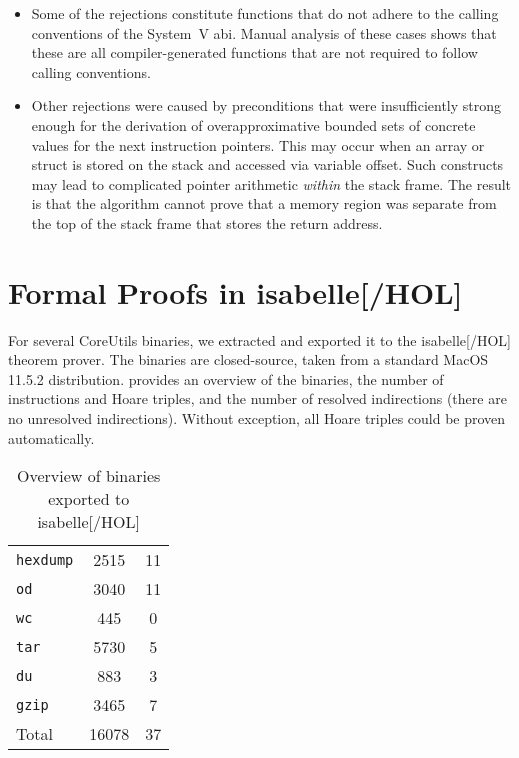 \begin{itemize}
  \item Some of the rejections constitute functions that do not adhere to the calling conventions of the System~V \ac{abi}.
  Manual analysis of these cases shows that these are all compiler-generated functions that are not required to follow calling conventions.
  \item Other rejections were caused by preconditions that were insufficiently strong enough for the derivation of overapproximative bounded sets of concrete values for the next instruction pointers.
  This may occur when an array or struct is stored on the stack and accessed via variable offset.
  Such constructs may lead to complicated pointer arithmetic \emph{within} the stack frame.
  The result is that the algorithm cannot prove that a memory region was separate from the top of the stack frame that stores the return address.
\end{itemize}

\section{Formal Proofs in \gls{isabelle}[/HOL]}\label{sec:not-me-proofs}
For several CoreUtils binaries, we extracted  and exported it to the \gls{isabelle}[/HOL] theorem prover.
The binaries are closed-source, taken from a standard MacOS 11.5.2 distribution.
 provides an overview of the binaries, the number of instructions and Hoare triples, and the number of resolved indirections (there are no unresolved indirections).
Without exception, all Hoare triples could be proven automatically.

\begin{table}
  \centering
  \caption{Overview of binaries exported to \gls{isabelle}[/HOL]}
  \label{tab:isa}
  \begin{tabular}{lSS}
    \toprule
     & {} & {}\\
    \midrule
    \texttt{hexdump} & 2515 & 11 \\
    \texttt{od}      & 3040 & 11 \\
    \texttt{wc}      &  445 &  0 \\
    \texttt{tar}     & 5730 & 5 \\
    \texttt{du}      &  883 & 3\\
    \texttt{gzip}    & 3465 & 7\\
    \midrule
    Total            & 16078 & 37 \\
    \bottomrule
  \end{tabular}
\end{table}

